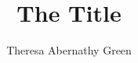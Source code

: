 \documentclass[
]{ucdthesis}
\author{Theresa Abernathy Green}
\title{The Title}
\begin{document}
\begin{frontmatter}
  \maketitle
  
  
  \tableofcontents
  \listoffigures
  \listoftables
\end{frontmatter}
\begin{mainmatter}
  
  
  
  \appendix %
  
  
\end{mainmatter}
\begin{backmatter}
  
  \printindex
\end{backmatter}
\end{document}
